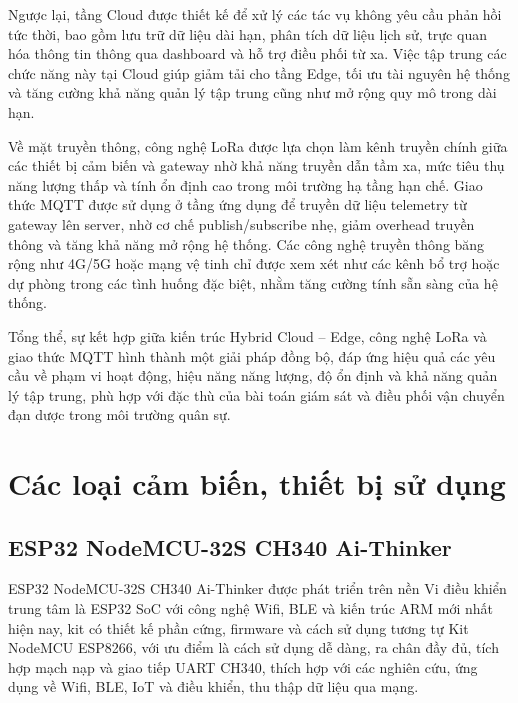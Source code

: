 Ngược lại, tầng Cloud được thiết kế để xử lý các tác vụ không yêu cầu phản hồi tức
thời, bao gồm lưu trữ dữ liệu dài hạn, phân tích dữ liệu lịch sử, trực quan hóa
thông tin thông qua dashboard và hỗ trợ điều phối từ xa. Việc tập trung các chức
năng này tại Cloud giúp giảm tải cho tầng Edge, tối ưu tài nguyên hệ thống và
tăng cường khả năng quản lý tập trung cũng như mở rộng quy mô trong dài hạn.

Về mặt truyền thông, công nghệ LoRa được lựa chọn làm kênh truyền chính giữa các
thiết bị cảm biến và gateway nhờ khả năng truyền dẫn tầm xa, mức tiêu thụ năng
lượng thấp và tính ổn định cao trong môi trường hạ tầng hạn chế. Giao thức MQTT
được sử dụng ở tầng ứng dụng để truyền dữ liệu telemetry từ gateway lên server,
nhờ cơ chế publish/subscribe nhẹ, giảm overhead truyền thông và tăng khả năng mở
rộng hệ thống. Các công nghệ truyền thông băng rộng như 4G/5G hoặc mạng vệ tinh
chỉ được xem xét như các kênh bổ trợ hoặc dự phòng trong các tình huống đặc biệt,
nhằm tăng cường tính sẵn sàng của hệ thống.

Tổng thể, sự kết hợp giữa kiến trúc Hybrid Cloud – Edge, công nghệ LoRa và giao
thức MQTT hình thành một giải pháp đồng bộ, đáp ứng hiệu quả các yêu cầu về phạm
vi hoạt động, hiệu năng năng lượng, độ ổn định và khả năng quản lý tập trung,
phù hợp với đặc thù của bài toán giám sát và điều phối vận chuyển đạn dược trong
môi trường quân sự.

\section{Các loại cảm biến, thiết bị sử dụng}
\subsection{ESP32 NodeMCU-32S CH340 Ai-Thinker}
ESP32 NodeMCU-32S CH340 Ai-Thinker được phát triển trên nền Vi điều khiển trung tâm là ESP32 SoC với công nghệ Wifi, BLE và kiến trúc ARM mới nhất hiện nay, kit có thiết kế phần cứng, firmware và cách sử dụng tương tự Kit NodeMCU ESP8266, với ưu điểm là cách sử dụng dễ dàng, ra chân đầy đủ, tích hợp mạch nạp và giao tiếp UART CH340, thích hợp với các nghiên cứu, ứng dụng về Wifi, BLE, IoT và điều khiển, thu thập dữ liệu qua mạng.


